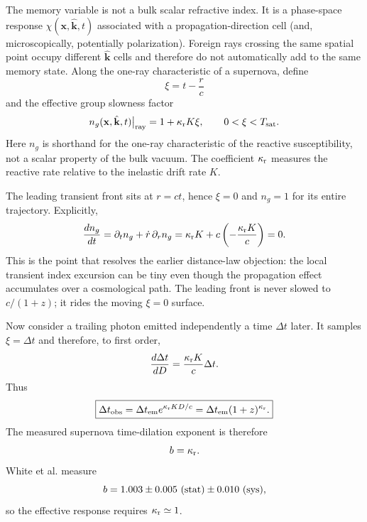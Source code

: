 \documentclass[11pt]{article}
\newcommand{\kreact}{\kappa_{\rm r}}
\begin{document}
The memory variable is not a bulk scalar refractive index. It is a phase-space response $\chi(\mathbf{x},\hat{\mathbf{k}},t)$ associated with a propagation-direction cell (and, microscopically, potentially polarization). Foreign rays crossing the same spatial point occupy different $\hat{\mathbf{k}}$ cells and therefore do not automatically add to the same memory state. Along the one-ray characteristic of a supernova, define
\begin{equation}
 \xi=t-\frac{r}{c}
 \label{eq:xi}
\end{equation}
and the effective group slowness factor
\begin{equation}
 n_g(\mathbf{x},\hat{\mathbf{k}},t)\big|_{\rm ray}
 =1+\kreact K\xi,
 \qquad 0<\xi<T_{\rm sat}.
 \label{eq:ng}
\end{equation}
Here $n_g$ is shorthand for the one-ray characteristic of the reactive susceptibility, not a scalar property of the bulk vacuum. The coefficient $\kreact$ measures the reactive rate relative to the inelastic drift rate $K$.

The leading transient front sits at $r=ct$, hence $\xi=0$ and $n_g=1$ for its entire trajectory. Explicitly,
\begin{equation}
 \frac{dn_g}{dt}=\partial_t n_g+\dot r\,\partial_r n_g
 =\kreact K+c\left(-\frac{\kreact K}{c}\right)=0.
 \label{eq:totalderiv}
\end{equation}
This is the point that resolves the earlier distance-law objection: the local transient index excursion can be tiny even though the propagation effect accumulates over a cosmological path. The leading front is never slowed to $c/(1+z)$; it rides the moving $\xi=0$ surface.

Now consider a trailing photon emitted independently a time $\Delta t$ later. It samples $\xi=\Delta t$ and therefore, to first order,
\begin{equation}
 \frac{d\Delta t}{dD}=\frac{\kreact K}{c}\Delta t.
\end{equation}
Thus
\begin{equation}
 \boxed{\Delta t_{\rm obs}=\Delta t_{\rm em}e^{\kreact KD/c}
       =\Delta t_{\rm em}(1+z)^{\kreact}.}
 \label{eq:timemap}
\end{equation}
The measured supernova time-dilation exponent is therefore
\begin{equation}
 b=\kreact.
 \label{eq:bkr}
\end{equation}
White et al. measure \citep{White2024}
\begin{equation}
 b=1.003\pm0.005\ ({\rm stat})\pm0.010\ ({\rm sys}),
 \label{eq:white}
\end{equation}
so the effective response requires $\kreact\simeq1$.
\end{document}
